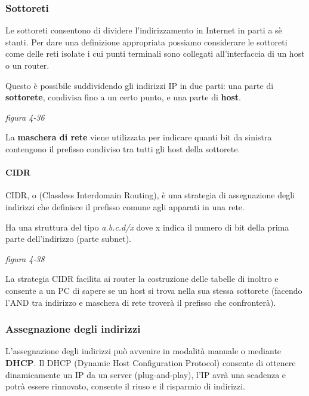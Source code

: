 \documentclass[
]{article}
\begin{document}
\hypertarget{header-n100}{%
\subsubsection{Sottoreti}\label{header-n100}}

Le sottoreti consentono di dividere l'indirizzamento in Internet in
parti a sè stanti. Per dare una definizione appropriata possiamo
considerare le sottoreti come delle reti isolate i cui punti terminali
sono collegati all'interfaccia di un host o un router.

Questo è possibile suddividendo gli indirizzi IP in due parti: una parte
di \textbf{sottorete}, condivisa fino a un certo punto, e una parte di
\textbf{host}.

\emph{figura 4-36}

La \textbf{maschera di rete} viene utilizzata per indicare quanti bit da
sinistra contengono il prefisso condiviso tra tutti gli host della
sottorete.

\hypertarget{header-n105}{%
\paragraph{CIDR}\label{header-n105}}

CIDR, o (Classless Interdomain Routing), è una strategia di assegnazione
degli indirizzi che definisce il prefisso comune agli apparati in una
rete.

Ha una struttura del tipo \emph{a.b.c.d/x} dove x indica il numero di
bit della prima parte dell'indirizzo (parte subnet).

\emph{figura 4-38}

La strategia CIDR facilita ai router la costruzione delle tabelle di
inoltro e consente a un PC di sapere se un host si trova nella sua
stessa sottorete (facendo l'AND tra indirizzo e maschera di rete troverà
il prefisso che confronterà).

\hypertarget{header-n110}{%
\subsubsection{Assegnazione degli indirizzi}\label{header-n110}}

L'assegnazione degli indirizzi può avvenire in modalità manuale o
mediante \textbf{DHCP}. Il DHCP (Dynamic Host Configuration Protocol)
consente di ottenere dinamicamente un IP da un server (plug-and-play),
l'IP avrà una scadenza e potrà essere rinnovato, consente il riuso e il
risparmio di indirizzi.
\end{document}
